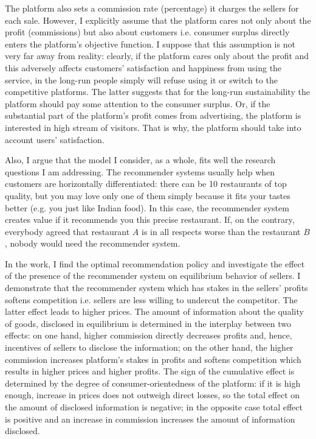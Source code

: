 \documentclass[a4paper]{article}
\begin{document}
	
	
	
	The platform also sets a commission rate (percentage) it charges the sellers for each sale. However, I explicitly assume that the platform cares not only about the profit (commissions) but also about customers i.e. consumer surplus directly enters the platform's objective function. I suppose that this assumption is not very far away from reality: clearly, if the platform cares only about the profit and this adversely affects customers' satisfaction and happiness from using the service, in the long-run people simply will refuse using it or switch to the competitive platforms. The latter suggests that for the long-run sustainability the platform should pay some attention to the consumer surplus. Or, if the substantial part of the platform's profit comes from advertising, the platform is interested in high stream of visitors. That is why, the platform should take into account users' satisfaction. 
	
	
	
	Also, I argue that the model I consider, as a whole, fits well the research questions I am addressing. The recommender systems usually help when customers are horizontally differentiated: there can be 10 restaurants of top quality, but you may love only one of them simply because it fits your tastes better (e.g. you just like Indian food). In this case, the recommender system creates value if it recommends you this precise restaurant. If, on the contrary, everybody agreed that restaurant $A$ is in all respects worse than the restaurant $B$, nobody would need the recommender system.
	
	
	
	
In the work, I find the optimal recommendation policy and investigate the effect of the presence of the recommender system on equilibrium behavior of sellers. I demonstrate that the recommender system which has stakes in the sellers' profits softens competition i.e. sellers are less willing to undercut the competitor. The latter effect leads to higher prices. The amount of information about the quality of goods, disclosed in equilibrium is determined in the interplay between two effects: on one hand, higher commission directly decreases profits and, hence, incentives of sellers to disclose the information; on the other hand, the higher commission increases platform's stakes in profits and softens competition which results in higher prices and higher profits. The sign of the cumulative effect is determined by the degree of consumer-orientedness of the platform: if it is high enough, increase in prices does not outweigh direct losses, so the total effect on the amount of disclosed information is negative; in the opposite case total effect is positive and an increase in commission increases the amount of information disclosed.
	
\end{document}
